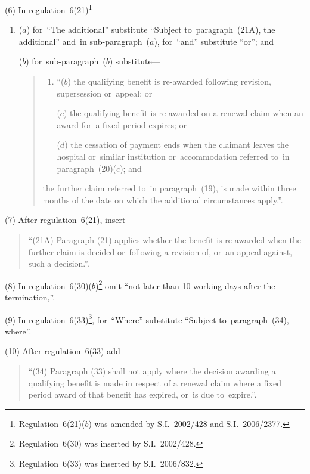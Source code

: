 \documentclass[12pt,a4paper]{article}
\begin{document}
(6) In regulation~6(21)\footnote{Regulation~6(21)($b$) was amended by S.I.~2002/428 and S.I.~2006/2377.}—
\begin{enumerate}\item[]
($a$) for~“The additional” substitute “Subject to~paragraph~(21A), the additional” and~in sub-paragraph~($a$), for~“and” substitute “or”; and

($b$) for~sub-paragraph~($b$)  substitute—
\begin{quotation}
\begin{enumerate}\item[]
“($b$) the qualifying benefit is re-awarded following revision, supersession or~appeal; or

($c$) the qualifying benefit is re-awarded on a renewal claim when an award for~a fixed period expires; or

($d$) the cessation of payment ends when the claimant leaves the hospital or~similar institution or~accommodation referred to~in paragraph~(20)($c$); and
\end{enumerate}
the further claim referred to~in paragraph~(19), is made within three months of the date on which the additional circumstances apply.”.
\end{quotation}
\end{enumerate}

(7) After regulation~6(21), insert—
\begin{quotation}
\begin{sloppypar}
“(21A) Paragraph (21) applies whether the benefit is re-\hspace{0pt}awarded when the further claim is decided or~following a revision of, or~an appeal against, such a decision.”.
\end{sloppypar}
\end{quotation}

(8) In regulation~6(30)($b$)\footnote{Regulation~6(30) was inserted by S.I.~2002/428.} omit “not later than 10 working days after the termination,”.

\begin{sloppypar}
(9) In regulation~6(33)\footnote{Regulation~6(33) was inserted by S.I.~2006/832.}, for~“Where” substitute “Subject to~paragraph~(34), where”.
\end{sloppypar}

(10) After regulation~6(33) add—
\begin{quotation}
“(34) Paragraph (33) shall not apply where the decision awarding a qualifying benefit is made in respect of a renewal claim where a fixed period award of that benefit has expired, or~is due to~expire.”.
\end{quotation}
\end{document}
